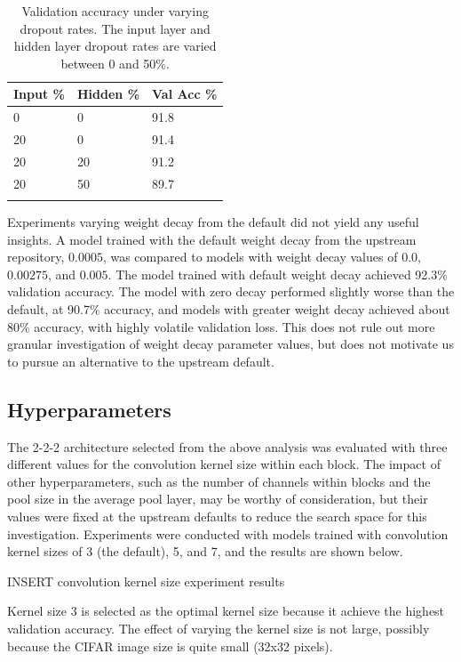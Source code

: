 \documentclass[letterpaper]{article} %
\begin{document}
\begin{table}[b]
\centering
\begin{tabular}{|l|l|l|}
    \firsthline
    Input \% & Hidden \% & Val Acc \%    \\
    \hline
    0 & 0 & 91.8    \\
    20 & 0 & 91.4    \\
    20 & 20 & 91.2    \\
    20 & 50 & 89.7    \\
    \lasthline
\end{tabular}
\caption{Validation accuracy under varying dropout rates. The input layer and hidden layer dropout rates are varied between 0 and 50\%.}
\label{table3}
\end{table}

Experiments varying weight decay from the default did not yield any useful insights.
A model trained with the default weight decay from the upstream repository, $0.0005 $,
was compared to models with weight decay values of $ 0.0 $, $ 0.00275 $, and $ 0.005 $.
The model trained with default weight decay achieved 92.3\% validation accuracy.
The model with zero decay performed slightly worse than the default, at 90.7\% accuracy, and
models with greater weight decay achieved about 80\% accuracy, with highly volatile validation
loss.
This does not rule out more granular investigation of weight decay parameter values, but does not
motivate us to pursue an alternative to the upstream default.

\subsection{Hyperparameters}

The 2-2-2 architecture selected from the above analysis was evaluated with three different values for the convolution
kernel size within each block.
The impact of other hyperparameters, such as the number of channels within blocks and the pool size in the average pool
layer, may be worthy of consideration, but their values were fixed at the upstream defaults to reduce the search space
for this investigation.
Experiments were conducted with models trained with convolution kernel sizes of 3 (the default), 5, and 7, and the
results are shown below.

INSERT convolution kernel size experiment results

Kernel size 3 is selected as the optimal kernel size because it achieve the highest validation accuracy.
The effect of varying the kernel size is not large, possibly because the CIFAR image size is quite small (32x32 pixels).
\end{document}
